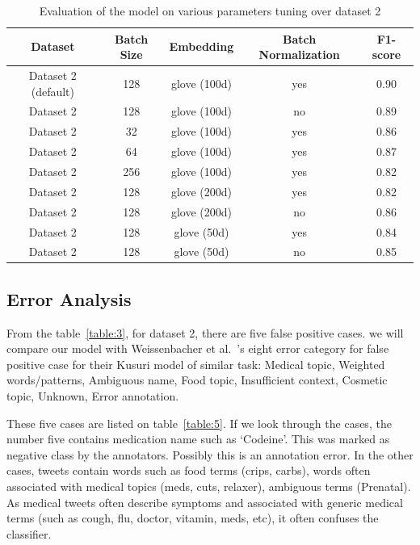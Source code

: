 \begin{table}[h!]
	\centering
	\begin{tabular}{||c c c c c||} 
		\hline
		Dataset & Batch Size & Embedding & Batch Normalization & F1-score\\ [0.5ex] 
		\hline\hline
		Dataset 2 (default) & 128 & glove (100d) & yes & 0.90 \\
		\hline
		Dataset 2 & 128 & glove (100d) & no & 0.89 \\
		\hline
		Dataset 2 & 32 & glove (100d) & yes & 0.86 \\
		\hline
		Dataset 2 & 64 & glove (100d) & yes & 0.87 \\
		\hline
		Dataset 2 & 256 & glove (100d) & yes & 0.82 \\
		\hline
		Dataset 2 & 128 & glove (200d) & yes & 0.82 \\
		\hline
		Dataset 2 & 128 & glove (200d) & no & 0.86 \\
		\hline
		Dataset 2 & 128 & glove (50d) & yes & 0.84 \\
		\hline
		Dataset 2 & 128 & glove (50d) & no & 0.85 \\
		\hline
	\end{tabular}
	\caption{Evaluation of the model on various parameters tuning over dataset 2}
	\label{table:4}
\end{table}


\subsection{Error Analysis}

From the table~\ref{table:3}, for dataset 2, there are five false positive cases. we will compare our model with Weissenbacher et al.~\cite{weissenbacher2019deep}'s eight error category for false positive case for their Kusuri model of similar task: Medical topic, Weighted words/patterns, Ambiguous name, Food topic, Insufficient context, Cosmetic topic, Unknown, Error annotation.

These five cases are listed on table~\ref{table:5}. If we look through the cases, the number five contains medication name such as `Codeine'. This was marked as negative class by the annotators. Possibly this is an annotation error. In the other cases, tweets contain words such as food terms (crips, carbs), words often associated with medical topics (meds, cuts, relaxer), ambiguous terms (Prenatal). As medical tweets often describe symptoms and associated with generic medical terms (such as cough, flu, doctor, vitamin, meds, etc), it often confuses the classifier.

